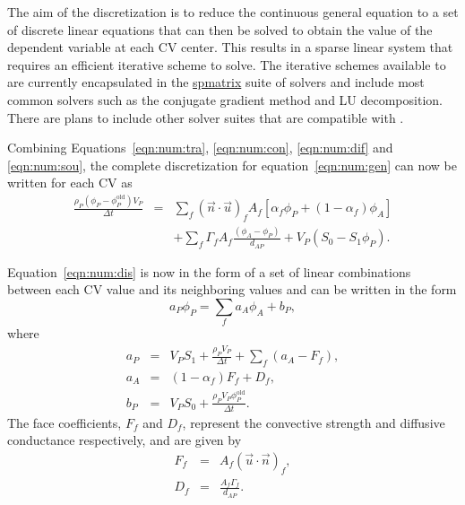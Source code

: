 The aim of the discretization is to reduce the continuous general
equation to a set of discrete linear equations that can then be solved
to obtain the value of the dependent variable at each CV center. This
results in a sparse linear system that requires an efficient iterative
scheme to solve. The iterative schemes available to \FiPy{} are
currently encapsulated in the \href{#id5}{spmatrix} suite of solvers
and include most common solvers such as the conjugate gradient method
and LU decomposition. There are plans to include other solver suites
that are compatible with \Python{}.

Combining Equations~\eqref{eqn:num:tra}, \eqref{eqn:num:con},
\eqref{eqn:num:dif} and \eqref{eqn:num:sou}, the complete
discretization for equation~\eqref{eqn:num:gen} can now be written for
each CV as
\begin{eqnarray}
\frac{\rho_{P}(\phi_{P} - \phi_P^\text{old}) V_P}{\Delta t}
&=&
\sum_{f} (\vec{n} \cdot \vec{u})_f A_f 
\left[\alpha_f \phi_P +\left(1-\alpha_f\right)\phi_A\right]
\nonumber \\
&&+
\sum_f \Gamma_f A_f \frac{(\phi_A-\phi_P)}{d_{AP}}
+ 
V_P ( S_0 - S_1 \phi_P ).
\label{eqn:num:dis}
\end{eqnarray}

Equation~\eqref{eqn:num:dis} is now in the form of a set of linear
combinations between each CV value and its neighboring values and can be
written in the form
\begin{equation}
a_P \phi_P = \sum_f a_{A} \phi_{A} + b_P,
\label{eqn:num:dap}
\end{equation}
where
\begin{eqnarray}
a_P & = & V_P S_1 + \frac{\rho_P V_P}{\Delta t} + \sum_f (a_{A} -
F_f), \\
a_{A} & = & ( 1 - \alpha_f ) F_f + D_f, \\
b_P & = & V_P S_0 + \frac{\rho_P V_P \phi_P^\text{old}}{\Delta t}.
\end{eqnarray}
The face coefficients, $F_f$ and $D_f$, represent the convective strength
and diffusive conductance respectively, and are given by
\begin{eqnarray}
F_f & = & A_f ( \vec{u} \cdot \vec{n} )_f, \\
D_f & = & \frac{A_f \Gamma_f}{d_{AP}} .
\end{eqnarray}












